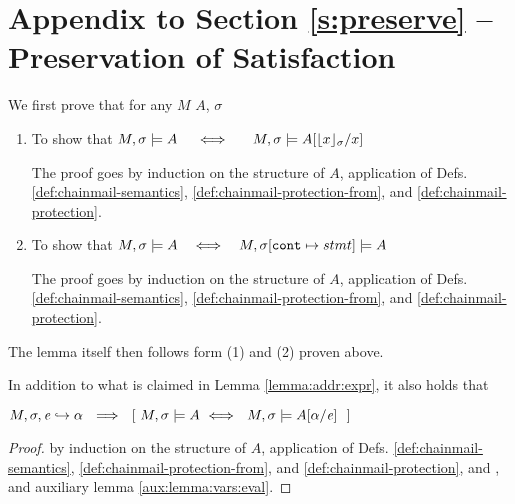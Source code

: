 \section{Appendix to Section \ref{s:preserve} -- Preservation of Satisfaction }
\label{app:preserve}

 

We first prove that for  any $M$ $A$, $\sigma$

\begin{enumerate}
\item
To show that  $ \satisfiesA{M}{\sigma}{A}\ \ \ \ \Longleftrightarrow \ \ \ \ \ \satisfiesA{M}{\sigma}{A[{\interpret \sigma x}/x]} $ 

The proof goes by induction on the structure of $A$,   application of  Defs.  \ref{def:chainmail-semantics}, \ref{def:chainmail-protection-from}, and  \ref{def:chainmail-protection}.


\item
To show that $ \satisfiesA{M}{\sigma}{A}   \ \ \ \Longleftrightarrow\ \ \ \satisfiesA{M}{\sigma[\prg{cont}\mapsto stmt]}{A}$ 

The proof goes by induction on the structure of $A$,   application of  Defs.  \ref{def:chainmail-semantics}, \ref{def:chainmail-protection-from}, and  \ref{def:chainmail-protection}.


\end{enumerate}

The lemma itself then follows form (1) and (2) proven above.

\completeProof

 
In addition to what is claimed in Lemma  \ref{lemma:addr:expr}, it  also holds that 
\begin{lemma}
$\eval{M}{\sigma}{{\re}}{\alpha}  \ \ \Longrightarrow\ \  [ \ \satisfiesA{M}{\sigma}{A} \  \Longleftrightarrow\   \  \satisfiesA{M}{\sigma}{A[\alpha/\re]} \  \  ]$
\end{lemma}

\begin{proof} by induction on the structure of $A$,   application of  Defs.  \ref{def:chainmail-semantics}, \ref{def:chainmail-protection-from}, and  \ref{def:chainmail-protection}, and , and auxiliary lemma \ref{aux:lemma:vars:eval}.

\end{proof}

